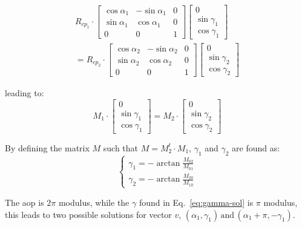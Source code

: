 \begin{equation}
\begin{split}
  R_{cp_{1}}\cdot
  \begin{bmatrix}
\cos\alpha_{1} & -\sin\alpha_{1} & 0\\
\sin\alpha_{1} & \cos\alpha_{1} & 0\\
0 & 0 & 1
\end{bmatrix}
\begin{bmatrix}
0\\
\sin\gamma_{1}\\
\cos\gamma_{1}
\end{bmatrix}
\\
=R_{cp_{2}}\cdot
\begin{bmatrix}
\cos\alpha_{2} & -\sin\alpha_{2} & 0\\
\sin\alpha_{2} & \cos\alpha_{2} & 0\\
0 & 0 & 1
\end{bmatrix}
\begin{bmatrix}
0\\
\sin\gamma_{2}\\
\cos\gamma_{2}
\end{bmatrix}
\end{split}
\end{equation}

leading to:
\begin{equation}
  M_{1}\cdot
  \begin{bmatrix}
0\\
\sin\gamma_{1}\\
\cos\gamma_{1}
\end{bmatrix}
=M_{2}\cdot
\begin{bmatrix}
0\\
\sin\gamma_{2}\\
\cos\gamma_{2}
\end{bmatrix}
\label{eq:2pts}
\end{equation}

\noindent By defining the matrix $M$ such
that $M=M_{2}^{t}\cdot M_{1}$, $\gamma_1$ and $\gamma_2$ are found as:
\begin{equation}
\begin{cases}
\gamma_{1}=-\arctan\frac{M_{02}}{M_{01}}\\
\gamma_{2}=-\arctan\frac{M_{20}}{M_{10}}
\end{cases}\label{eq:gamma-sol}
\end{equation}

The \gls{aop} is $2\pi$ modulus, while the $\gamma$ found in
Eq.~\ref{eq:gamma-sol} is $\pi$ modulus, this leads to two possible solutions
for vector $v$,
$\left(\alpha_{1},\gamma_{1}\right)\,\text{and}\,\left(\alpha_{1}+\pi,-\gamma_{1}\right)$.


